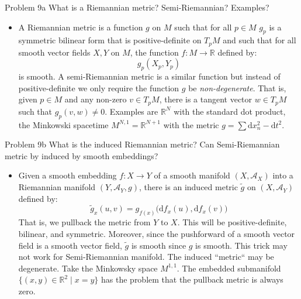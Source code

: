 \documentclass{beamer}
\begin{document}
    \begin{frame}{Problem 9a}
        What is a Riemannian metric? Semi-Riemannian? Examples?
        \begin{itemize}
            \item A Riemannian metric is a function $g$ on $M$ such that for all
                $p\in{M}$ $g_{p}$ is a symmetric bilinear form that is
                positive-definite on $T_{p}M$ and such that for all smooth
                vector fields $X,Y$ on $M$, the function $f:M\rightarrow\mathbb{R}$
                defined by:
                \begin{equation}
                    g_{p}(X_{p},Y_{p})
                \end{equation}
                is smooth. A semi-Riemannian metric is a similar function but
                instead of positive-definite we only require the function $g$
                be \textit{non-degenerate}. That is, given $p\in{M}$ and any
                non-zero $v\in{T}_{p}M$, there is a tangent vector
                $w\in{T}_{p}M$ such that $g_{p}(v,w)\ne{0}$. Examples are
                $\mathbb{R}^{N}$ with the standard dot product, the Minkowski
                spacetime $M^{N,1}=\mathbb{R}^{N+1}$ with the metric
                $g=\sum\textrm{d}x_{n}^{2}-\textrm{d}t^{2}$.
        \end{itemize}
    \end{frame}
    \begin{frame}{Problem 9b}
        What is the induced Riemannian metric? Can Semi-Riemannian metric
        by induced by smooth embeddings?
        \begin{itemize}
            \item Given a smooth embedding $f:X\rightarrow{Y}$ of a smooth
            manifold $(X,\mathcal{A}_{X})$ into a Riemannian manifold
            $(Y,\mathcal{A}_{Y},g)$, there is an induced metric $\tilde{g}$ on
            $(X,\mathcal{A}_{Y})$ defined by:
            \begin{equation}
                \tilde{g}_{x}(u,v)=
                    g_{f(x)}\big(\textrm{d}f_{x}(u),\textrm{d}f_{x}(v)\big)
            \end{equation}
            That is, we pullback the metric from $Y$ to $X$. This will be
            positive-definite, bilinear, and symmetric. Moreover, since the
            pushforward of a smooth vector field is a smooth vector field,
            $\tilde{g}$ is smooth since $g$ is smooth. This trick may not
            work for Semi-Riemannian manifold. The induced ``metric`` may be
            degenerate. Take the Minkowsky space $M^{1,1}$. The embedded
            submanifold $\{(x,y)\in\mathbb{R}^{2}\;|\;x=y\}$ has the problem
            that the pullback metric is always zero.
        \end{itemize}
    \end{frame}
\end{document}
